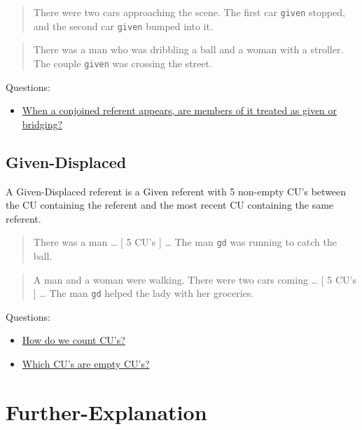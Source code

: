 \documentclass[
]{book}
\providecommand{\tightlist}{%
  \setlength{\itemsep}{0pt}\setlength{\parskip}{0pt}}
\begin{document}
\begin{quote}
There were two cars approaching the scene.
The first car \texttt{given} stopped, and the second car \texttt{given} bumped into it.
\end{quote}

\begin{quote}
There was a man who was dribbling a ball and a woman with a stroller.
The couple \texttt{given} was crossing the street.
\end{quote}

Questions:

\begin{itemize}
\tightlist
\item
  \protect\hyperlink{conjoined-referent-members}{When a conjoined referent appears, are members of it treated as given or bridging?}
\end{itemize}

\hypertarget{given-displaced}{%
\subsection{Given-Displaced}\label{given-displaced}}

A Given-Displaced referent is a Given referent with 5 non-empty CU's between the CU containing the referent and the most recent CU containing the same referent.

\begin{quote}
There was a man \ldots{}
{[} 5 CU's {]} \ldots{}
The man \texttt{gd} was running to catch the ball.
\end{quote}

\begin{quote}
A man and a woman were walking.
There were two cars coming \ldots{}
{[} 5 CU's {]} \ldots{}
The man \texttt{gd} helped the lady with her groceries.
\end{quote}

Questions:

\begin{itemize}
\tightlist
\item
  \protect\hyperlink{counting-cus}{How do we count CU's?}
\item
  \protect\hyperlink{empty-cus}{Which CU's are empty CU's?}
\end{itemize}

\hypertarget{further-explanation}{%
\section{Further-Explanation}\label{further-explanation}}
\end{document}
